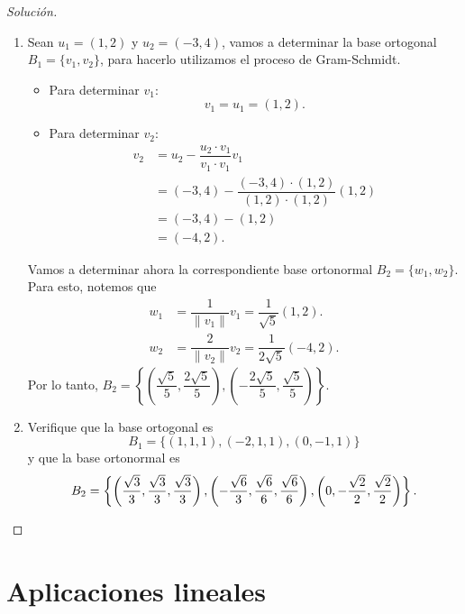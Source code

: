 \documentclass[a4,11pt]{aleph-notas}
\begin{document}
\begin{proof}[Solución]\hspace{0pt}
    \begin{enumerate}
    \item Sean $u_{1} = (1, 2)$ y $u_{2} = (-3, 4)$, vamos a determinar la base ortogonal $B_{1}=\{v_{1}, v_{2}\}$, para hacerlo utilizamos el proceso de Gram-Schmidt.
    \begin{itemize}
        \item Para determinar $v_{1}$: 
        \[
            v_{1} = u_{1} = (1, 2).
        \]
        \item Para determinar $v_{2}$:
        \begin{align*}
            v_{2} &= u_{2} - \dfrac{u_{2} \cdot v_{1}}{v_{1} \cdot v_{1}}v_{1}\\
                  &= (-3, 4) - \dfrac{(-3, 4) \cdot (1, 2)}{(1, 2) \cdot (1, 2)}(1, 2)\\
                  &= (-3, 4) - (1, 2)\\
                  &= (-4, 2).
        \end{align*}
    \end{itemize}
    Vamos a determinar ahora la correspondiente base ortonormal $B_{2}=\{w_{1}, w_{2}\}$. Para esto, notemos que
    \begin{align*}
        w_{1} &= \dfrac{1}{\|v_{1}\|}v_{1} = \dfrac{1}{\sqrt{5}}(1, 2).\\
        w_{2} &= \dfrac{2}{\|v_{2}\|}v_{2} = \dfrac{1}{2\sqrt{5}}(-4, 2).
    \end{align*}
    Por lo tanto, $B_{2}=\left\{\left(\dfrac{\sqrt{5}}{5}, \dfrac{2\sqrt{5}}{5}\right), \left(-\dfrac{2\sqrt{5}}{5}, \dfrac{\sqrt{5}}{5}\right)\right\}$.
    \item Verifique que la base ortogonal es
    \[
        B_{1} = \{(1, 1, 1), (-2, 1, 1), (0, -1, 1)\}
    \]
    y que la base ortonormal es
    \[
        B_{2} = \left\{\left(\dfrac{\sqrt{3}}{3}, \dfrac{\sqrt{3}}{3}, \dfrac{\sqrt{3}}{3}\right), \left(-\dfrac{\sqrt{6}}{3}, \dfrac{\sqrt{6}}{6}, \dfrac{\sqrt{6}}{6}\right), \left(0, -\dfrac{\sqrt{2}}{2}, \dfrac{\sqrt{2}}{2}\right)\right\}. \qedhere
    \]
\end{enumerate}
\end{proof}

\section{Aplicaciones lineales}
\end{document}
